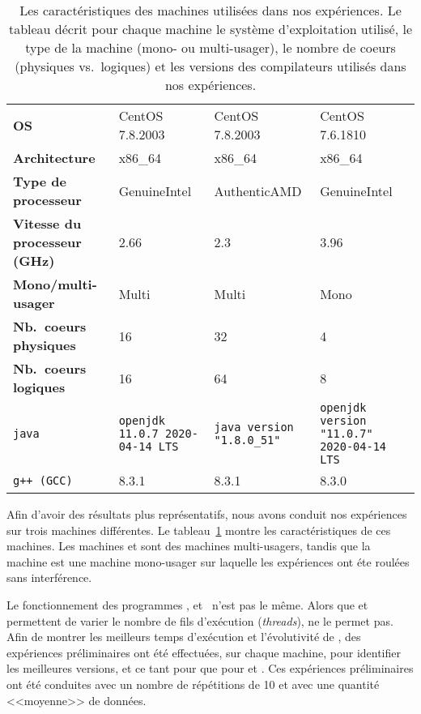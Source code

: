 \newcommand{\LARGEUR}{3cm}

\begin{table}
\begin{tabular}{|p{3cm}|p{\LARGEUR}|p{\LARGEUR}|p{\LARGEUR}|}
\hline
  & \M1 & \M2 & \M3
\\\hline
\textbf{OS} & CentOS 7.8.2003 & CentOS 7.8.2003 & CentOS 7.6.1810
\\\hline
\textbf{Architecture} &  x86\_64 & x86\_64 & x86\_64
\\\hline
\textbf{Type de processeur} & GenuineIntel  & AuthenticAMD & GenuineIntel
\\\hline
\textbf{Vitesse du processeur (GHz)} & 2.66 & 2.3 & 3.96
\\\hline
\textbf{Mono/multi-usager} & Multi & Multi & Mono
\\\hline
\textbf{Nb.~coeurs physiques} & 16 & 32 & 4
\\\hline
\textbf{Nb.~coeurs logiques} & 16 & 64 & 8
\\\hline
\texttt{java}
  & \texttt{openjdk 11.0.7 2020-04-14 LTS}
  & \texttt{java version "1.8.0\_51"}
  & \texttt{openjdk version "11.0.7" 2020-04-14 LTS}
\\\hline
\texttt{g++ (GCC)}
   & 8.3.1
   & 8.3.1 
   & 8.3.0
\\\hline
\end{tabular}
\caption[Les caract\'eristiques des machines utilis\'ees dans nos exp\'eriences.]{Les caract\'eristiques des machines utilis\'ees dans nos exp\'eriences. Le tableau d\'ecrit pour chaque machine le syst\`eme d'exploitation utilis\'e, le type de la machine (mono- ou multi-usager), le nombre de coeurs (physiques vs.\ logiques) et les versions des compilateurs utilis\'es dans nos exp\'eriences.}
\label{machines.table}
\end{table}


Afin d'avoir des r\'esultats plus représentatifs, nous avons conduit nos exp\'eriences sur trois machines diff\'erentes. Le tableau~\ref{machines.table} montre les caract\'eristiques de ces machines. Les machines  et  sont des machines multi-usagers, tandis que la machine  est une machine mono-usager sur laquelle les exp\'eriences ont \'et\/e roul\'ees sans interf\'erence.

Le fonctionnement des programmes ,  et~ n'est pas le m\^eme. Alors que  et  permettent de varier le nombre de fils d'ex\'ecution (\emph{threads}),  ne le permet pas. Afin de montrer les meilleurs temps d'ex\'ecution et l'\'evolutivit\'e de , des exp\'eriences pr\'eliminaires ont \'et\'e effectu\'ees, sur chaque machine, pour identifier les meilleures versions, et ce tant pour  que pour  et .
Ces exp\'eriences pr\'eliminaires ont \'et\'e conduites avec un nombre de r\'ep\'etitions de 10 et avec une quantit\'e <<moyenne>> de donn\'ees. 

